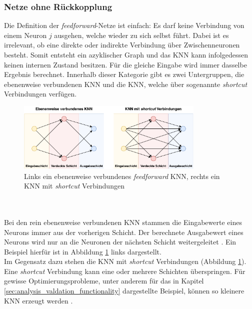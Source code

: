 \subsubsection{Netze ohne Rückkopplung}
Die Definition der \emph{feedforward}-Netze ist einfach: Es darf keine Verbindung von einem Neuron $j$ ausgehen, welche wieder zu sich selbst führt. Dabei ist es irrelevant, ob eine direkte oder indirekte Verbindung über Zwischenneuronen besteht. Somit entsteht ein azyklischer Graph \cite{zell2003simulation} und das \ac{KNN} kann infolgedessen keinen internen Zustand besitzen. Für die gleiche Eingabe wird immer dasselbe Ergebnis berechnet. Innerhalb dieser Kategorie gibt es zwei Untergruppen, die ebenenweise verbundenen \ac{KNN} und die \ac{KNN}, welche über sogenannte \emph{shortcut} Verbindungen verfügen.
\begin{figure}[h]
	\centering
	\includegraphics[width=0.8\textwidth]{./img/neural_network_basics/feed_forward_networks.pdf} 
	\caption{Links ein ebenenweise verbundenes \emph{feedforward} KNN, rechts ein KNN mit \emph{shortcut} Verbindungen}
	\label{fig:feed_forward_network_structures}
\end{figure}
\\\\
Bei den rein ebenenweise verbundenen \ac{KNN} stammen die Eingabewerte eines Neurons immer aus der vorherigen Schicht. Der berechnete Ausgabewert eines Neurons wird nur an die Neuronen der nächsten Schicht weitergeleitet \cite{zell2003simulation}. Ein Beispiel hierfür ist in Abbildung \ref{fig:feed_forward_network_structures} links dargestellt.\\
Im Gegensatz dazu stehen die \ac{KNN} mit \emph{shortcut} Verbindungen (Abbildung \ref{fig:feed_forward_network_structures}). Eine \emph{shortcut} Verbindung kann eine oder mehrere Schichten überspringen. Für gewisse Optimierungsprobleme, unter anderem für das in Kapitel \ref{sec:analysis_valdation_functionality} dargestellte Beispiel, können so kleinere \ac{KNN} erzeugt werden \cite{zell2003simulation}. 

